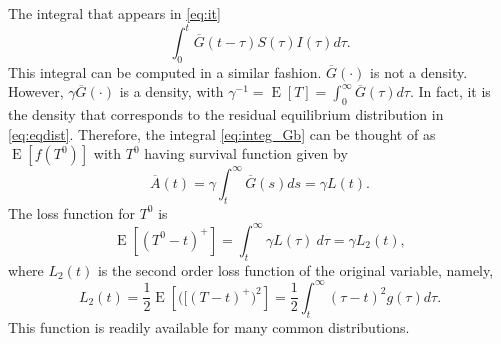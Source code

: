 \documentclass[USenglish,10pt]{article}
\newcommand{\Ab}{\overline{A}\xspace}
\newcommand{\Gb}{\overline{G}\xspace}
\DeclareMathOperator{\Exp}{E}       %
\newcommand{\E}[1]{\Exp\left[{#1}\right]}       %
\begin{document}
The integral that appears in \eqref{eq:it}
\begin{equation}
	\int_0^t \Gb(t-\tau ) S(\tau)I(\tau)d\tau.
	\label{eq:integ_Gb}
\end{equation}
This integral can be computed in a similar fashion. $\Gb(\cdot)$  is not a density.
However, $\gamma\Gb(\cdot)$ is a density, with $\gamma^{-1}=\E{T}=\int_0^\infty\Gb(\tau)d\tau$.
In fact,  it is the density that corresponds to the residual equilibrium distribution in \eqref{eq:eqdist}.
Therefore, the integral \eqref{eq:integ_Gb} can be thought of as $\E{f(T^0)}$ with $T^0$ having survival function given by
\[ \Ab(t) = \gamma \int_t^\infty \Gb(s)ds = \gamma L(t).\]
The loss function for $T^0$ is
\[ \E{(T^0-t)^+} = \int_t^\infty \gamma L(\tau)\ d\tau  = \gamma L_2(t),\]
where $L_2(t)$ is the second order loss function of the original variable, namely,
\[ L_2(t) = \frac{1}{2} \E{\big([(T-t)^+\big)^2} = \frac{1}{2}\int_t^\infty (\tau-t)^2 g(\tau)d\tau. \]
This function is readily available for many common distributions.












\end{document}
